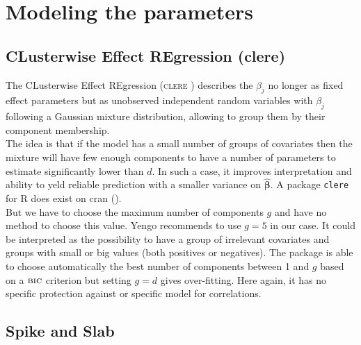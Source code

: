 \documentclass[12pt,a4paper]{report}
\begin{document}
	
		\FloatBarrier

	\section{Modeling the parameters}			%

		\subsection{CLusterwise Effect REgression ({\sc clere})}		%

			The CLusterwise Effect REgression (\textsc{clere} \cite{yengo2012variable}) describes the $\beta_j$ no longer as fixed effect parameters but as unobserved independent random variables with $\beta_j$ following a Gaussian mixture distribution, allowing to group them by their component membership. \\
			
			 The idea is that if the model has a small number of groups of covariates then the mixture will have few enough components to have a number of parameters to estimate significantly lower than $d$. In such a case, it improves interpretation and ability to yeld reliable prediction with a smaller variance on $\boldsymbol{\hat{\beta}}$. A package {\tt clere} for R does exist on {\sc cran} (\cite{packageclere}).%
			 \\
			 
			 But we have to choose the maximum number of components $g$ and have no method to choose this value. Yengo recommends to use $g=5$ in our case. It could be interpreted as the possibility to have a group of irrelevant covariates and groups with small or big values (both positives or negatives). The package is able to choose automatically the best number of components between 1 and $g$ based on a $\mbox{{\sc bic}}$ criterion but setting $g=d$ gives over-fitting.
	 Here again, it has no specific protection against or specific model for correlations. 
		\subsection{Spike and Slab}			%
\end{document}
